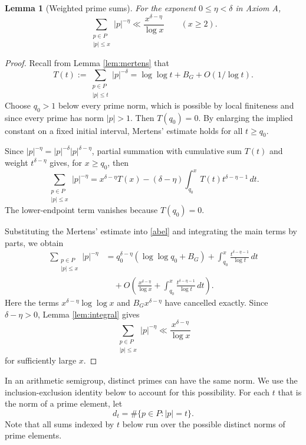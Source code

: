 \documentclass[a4paper]{amsart}
\newtheorem{lemma}[theorem]{Lemma}
\begin{document}
\begin{lemma}[Weighted prime sums]\label{lem:weighted}
For the exponent $0\le\eta<\delta$ in Axiom A,
\[
\sum_{\substack{p\in P\\|p|\le x}}|p|^{-\eta}
\ll\frac{x^{\delta-\eta}}{\log x}
\qquad(x\ge2).
\]
\end{lemma}

\begin{proof}
Recall from Lemma \ref{lem:mertens} that
\[
T(t):=\sum_{\substack{p\in P\\|p|\le t}}|p|^{-\delta}
=\log\log t+B_G+O(1/\log t).
\]
Choose $q_0>1$ below every prime norm, which is
possible by local finiteness and since every prime has norm $|p| > 1$. Then $T(q_0)=0$.
By enlarging the implied constant on a fixed initial
interval, Mertens' estimate holds for all $t\ge q_0$.

Since $|p|^{-\eta}=|p|^{-\delta}|p|^{\delta-\eta}$,
partial summation with cumulative sum $T(t)$ and
weight $t^{\delta-\eta}$ gives, for $x\ge q_0$, then
\begin{equation}\label{abel}
\sum_{\substack{p\in P\\|p|\le x}}|p|^{-\eta}
=x^{\delta-\eta}T(x)-(\delta-\eta)\int_{q_0}^x
T(t)t^{\delta-\eta-1}\,dt.
\end{equation}
The lower-endpoint term vanishes because $T(q_0)=0$.

Substituting the Mertens' estimate into \eqref{abel}
and integrating the main terms by parts, we obtain
\begin{align*}
\sum_{\substack{p\in P\\|p|\le x}}|p|^{-\eta}
&=
q_0^{\delta-\eta}(\log\log q_0+B_G)
+\int_{q_0}^x\frac{t^{\delta-\eta-1}}{\log t}\,dt\\
&\quad+
O\!\left(
\frac{x^{\delta-\eta}}{\log x}
+\int_{q_0}^x\frac{t^{\delta-\eta-1}}{\log t}\,dt
\right).
\end{align*}
Here the terms $x^{\delta-\eta}\log\log x$ and
$B_Gx^{\delta-\eta}$ have cancelled exactly.
Since $\delta-\eta>0$, Lemma \ref{lem:integral} gives
\[
\sum_{\substack{p\in P\\|p|\le x}}|p|^{-\eta}
\ll\frac{x^{\delta-\eta}}{\log x}
\]
for sufficiently large $x$.
\end{proof}
In an arithmetic semigroup, distinct primes can have the same
norm. We use the inclusion-exclusion identity below to account for
this possibility.
For each $t$ that is the norm of a prime element, let
\[
d_t=\#\{p\in P:|p|=t\}.
\]
Note that all sums indexed by $t$ below run over the possible distinct norms
of prime elements.
\end{document}
